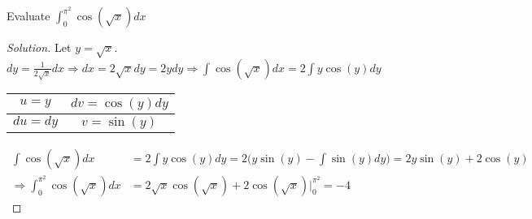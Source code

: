 \documentclass[crop=false,class=book]{standalone}
\begin{document}
\begin{problem}
Evaluate $\int_{0}^{\pi^{2}}\cos(\sqrt{x})dx$
\end{problem}
\begin{proof}[Solution]
Let $y=\sqrt{x}$. $dy=\frac{1}{2\sqrt{x}}dx\Rightarrow dx=2\sqrt{x}dy=2ydy\Rightarrow\int\cos(\sqrt{x})dx=2\int y\cos(y)dy$
\begin{table}[H]
    \centering
    \begin{tabular}{|c|c|}
        \hline
        $u=y$&$dv=\cos(y)dy$\\
        \hline
        $du=dy$&$v=\sin(y)$\\
        \hline
    \end{tabular}
\end{table}
\begin{align*}
    \int\cos(\sqrt{x})dx&=2\int y\cos(y)dy=2\big(y\sin(y)-\int\sin(y)dy\big)=2y\sin(y)+2\cos(y)\\
    \Rightarrow \int_{0}^{\pi^{2}}\cos(\sqrt{x})dx&=2\sqrt{x}\cos(\sqrt{x})+2\cos(\sqrt{x})\big|_{0}^{\pi^{2}}=-4
\end{align*}
\end{proof}
\end{document}
